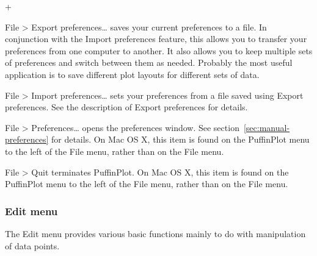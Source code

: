 \documentclass[a4paper]{article}
\newcommand{\menuitemlabel}[1]{%
\mbox{\textsf{#1}}\hfil}
\newenvironment{menuitemlist}%
{\begin{list}{}{%
\renewcommand{\makelabel}{\menuitemlabel}%
\setlength{\labelwidth}{35pt}%
\setlength{\leftmargin}%
             {\labelwidth+\labelsep}}}%
{\end{list}}
\newcommand{\ppcmd}[1]{\textsf{#1}} %
\newcommand{\submenu}{ \textgreater{} } %
\begin{document}
\begin{menuitemlist}
\item[File\submenu Export preferences\ldots] saves your current preferences to
a file. In conjunction with the \ppcmd{Import preferences} feature, this
allows you to transfer your preferences from one computer to another. It also
allows you to keep multiple sets of preferences and switch between them as
needed. Probably the most useful application is to save different plot
layouts for different sets of data.

\item[File\submenu Import preferences\ldots] sets your preferences from
a file saved using \ppcmd{Export preferences}. See the description of
\ppcmd{Export preferences} for details.

\item[File\submenu Preferences\ldots] opens the preferences window. See
section~\ref{sec:manual-preferences} for details. On Mac OS X, this item is
found on the \ppcmd{PuffinPlot} menu to the left of the \ppcmd{File} menu,
rather than on the \ppcmd{File} menu.

\item[File\submenu Quit] terminates PuffinPlot. On Mac OS X, this item is
found on the \ppcmd{PuffinPlot} menu to the left of the \ppcmd{File} menu,
rather than on the \ppcmd{File} menu.

\end{menuitemlist}

\FloatBarrier
\subsubsection{Edit menu}

The \ppcmd{Edit} menu provides various basic functions mainly
to do with manipulation of data points.
\end{document}
